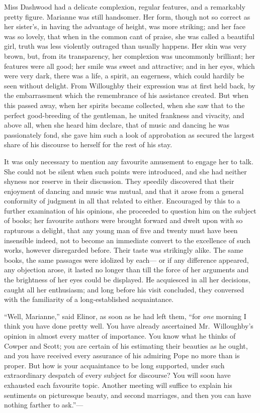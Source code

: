 Miss Dashwood had a delicate complexion,
regular features, and a remarkably pretty figure.
Marianne was still handsomer.  Her form, though not so
correct as her sister's, in having the advantage of height,
was more striking; and her face was so lovely, that when
in the common cant of praise, she was called a beautiful girl,
truth was less violently outraged than usually happens.
Her skin was very brown, but, from its transparency,
her complexion was uncommonly brilliant; her features
were all good; her smile was sweet and attractive;
and in her eyes, which were very dark, there was a life,
a spirit, an eagerness, which could hardily be seen
without delight.  From Willoughby their expression was at
first held back, by the embarrassment which the remembrance
of his assistance created.  But when this passed away,
when her spirits became collected, when she saw that to the
perfect good-breeding of the gentleman, he united frankness
and vivacity, and above all, when she heard him declare,
that of music and dancing he was passionately fond,
she gave him such a look of approbation as secured the
largest share of his discourse to herself for the rest
of his stay.

It was only necessary to mention any favourite
amusement to engage her to talk.  She could not be
silent when such points were introduced, and she
had neither shyness nor reserve in their discussion.
They speedily discovered that their enjoyment of dancing
and music was mutual, and that it arose from a general
conformity of judgment in all that related to either.
Encouraged by this to a further examination of his opinions,
she proceeded to question him on the subject of books;
her favourite authors were brought forward and dwelt
upon with so rapturous a delight, that any young man of
five and twenty must have been insensible indeed, not to
become an immediate convert to the excellence of such works,
however disregarded before.  Their taste was strikingly alike.
The same books, the same passages were idolized by each---%
or if any difference appeared, any objection arose,
it lasted no longer than till the force of her arguments
and the brightness of her eyes could be displayed.
He acquiesced in all her decisions, caught all her enthusiasm;
and long before his visit concluded, they conversed
with the familiarity of a long-established acquaintance.

``Well, Marianne,'' said Elinor, as soon as he had left them,
``for \emph{one} morning I think you have done pretty well.
You have already ascertained Mr.\ Willoughby's opinion in
almost every matter of importance.  You know what he thinks
of Cowper and Scott; you are certain of his estimating
their beauties as he ought, and you have received every
assurance of his admiring Pope no more than is proper.
But how is your acquaintance to be long supported, under such
extraordinary despatch of every subject for discourse?
You will soon have exhausted each favourite topic.
Another meeting will suffice to explain his sentiments
on picturesque beauty, and second marriages, and then
you can have nothing farther to ask.''---%

